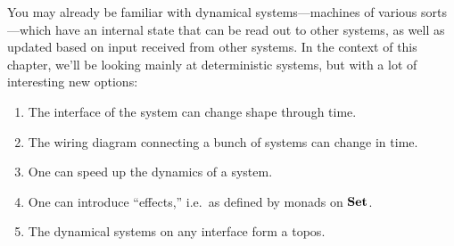 \documentclass[Book-Poly]{subfiles}
\begin{document}

You may already be familiar with dynamical systems---machines of various sorts---which have an internal state that can be read out to other systems, as well as updated based on input received from other systems. In the context of this chapter, we'll be looking mainly at deterministic systems, but with a lot of interesting new options:
\begin{enumerate}
	\item The interface of the system can change shape through time.
	\item The wiring diagram connecting a bunch of systems can change in time.
	\item One can speed up the dynamics of a system.
	\item One can introduce ``effects,'' i.e.\ as defined by monads on $\textbf{Set}$.
	\item The dynamical systems on any interface form a topos.
\end{enumerate}
\end{document}
